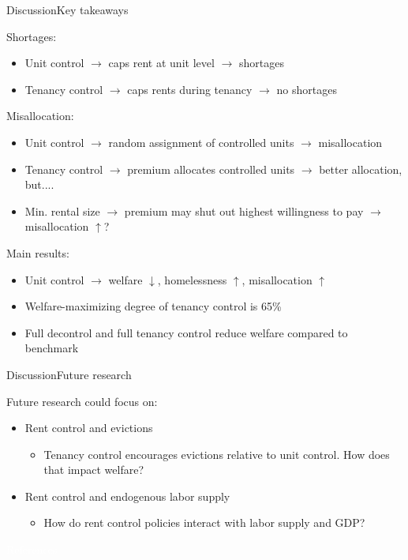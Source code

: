 \documentclass[11pt,aspectratio=169]{beamer}
\begin{document}
\begin{frame}{Discussion}{Key takeaways}

Shortages:
\begin{itemize}
    \item Unit control $\rightarrow$ caps rent at unit level $\rightarrow$ shortages
    \item Tenancy control $\rightarrow$ caps rents during tenancy $\rightarrow$ no shortages
\end{itemize}

\vspace{0.1cm}

Misallocation:
\begin{itemize}
    \item Unit control $\rightarrow$ random assignment of controlled units $\rightarrow$ misallocation
    \item Tenancy control $\rightarrow$ premium allocates controlled units $\rightarrow$ better allocation, but....
    \item Min. rental size $\rightarrow$ premium may shut out highest willingness to pay $\rightarrow$ misallocation $\uparrow$?
\end{itemize}

\vspace{0.1cm}

Main results:
\begin{itemize}
    \item Unit control $\rightarrow$ welfare $\downarrow$, homelessness $\uparrow$, misallocation $\uparrow$ 
    \item Welfare-maximizing degree of tenancy control is 65\%
    \item Full decontrol and full tenancy control reduce welfare compared to benchmark
\end{itemize}

\end{frame}

\begin{frame}{Discussion}{Future research}
 
Future research could focus on:
\begin{itemize}
    \item Rent control and evictions
    \begin{itemize}
        \item Tenancy control encourages evictions relative to unit control. How does that impact welfare?
    \end{itemize}
    \item Rent control and endogenous labor supply
    \begin{itemize}
        \item How do rent control policies interact with labor supply and GDP?
    \end{itemize}
\end{itemize}
 
\end{frame}

{
\begin{frame}{}

\centering \Large
\textcolor{white}{References}
    
\end{frame}

}



\end{document}
